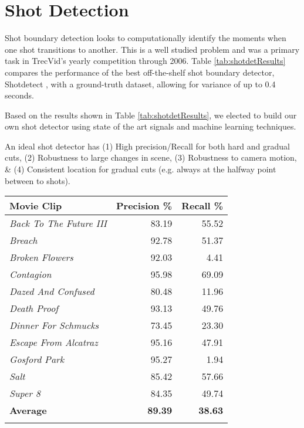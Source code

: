 \section*{Shot Detection}

Shot boundary detection looks to computationally identify the moments when one shot transitions to another. This is a well studied problem \cite{boreczky1996comparison} \cite{lienhart1998comparison} \cite{lu2013fast} \cite{chavan2014review} and was a primary task in TrecVid's yearly competition \cite{smeaton_video_2010} through 2006. Table \ref{tab:shotdetResults} compares the performance of the best off-the-shelf shot boundary detector, Shotdetect \cite{mathe_shotdetect_2015}, with a ground-truth dataset, allowing for variance of up to 0.4 seconds. 

Based on the results shown in Table \ref{tab:shotdetResults}, we elected to build our own shot detector using state of the art signals and machine learning techniques.

An ideal shot detector has (1) High precision/Recall for both hard and gradual cuts, (2) Robustness to large changes in scene, (3) Robustness to camera motion, \& (4) Consistent location for gradual cuts (e.g. always at the halfway point between to shots).


\begin{center}
  \begin{tabular}{ l | r r }
    Movie Clip & Precision \% & Recall \% \\
    \hline
    \textit{ Back To The Future III } &  83.19 &  55.52\\
    \textit{ Breach } &  92.78 &  51.37\\
    \textit{ Broken Flowers } &  92.03 &  4.41\\
    \textit{ Contagion } &  95.98 &  69.09\\
    \textit{ Dazed And Confused } &  80.48 &  11.96\\
    \textit{ Death Proof } &  93.13 &  49.76\\
    \textit{ Dinner For Schmucks } &  73.45 &  23.30\\
    \textit{ Escape From Alcatraz } &  95.16 &  47.91\\
    \textit{ Gosford Park } &  95.27 &  1.94\\
    \textit{ Salt } &  85.42 &  57.66\\
    \textit{ Super 8 } &  84.35 &  49.74\\
    \textbf{ Average } &  \textbf{89.39} &  \textbf{38.63}\\
    \label{tab:shotdetResults}
  \end{tabular}
\end{center}


